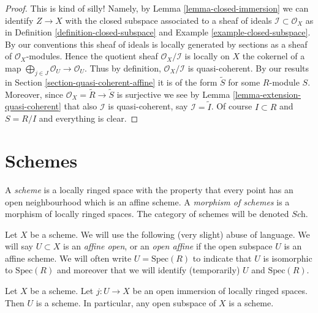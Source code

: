 \begin{proof}
This is kind of silly! Namely, by Lemma \ref{lemma-closed-immersion}
we can identify $Z \to X$ with the closed subspace associated to
a sheaf of ideals $\mathcal{I} \subset \mathcal{O}_X$ as in
Definition \ref{definition-closed-subspace} and
Example \ref{example-closed-subspace}.
By our conventions this sheaf of ideals is locally generated
by sections as a sheaf of $\mathcal{O}_X$-modules.
Hence the quotient sheaf $\mathcal{O}_X / \mathcal{I}$
is locally on $X$ the cokernel
of a map $\bigoplus_{j \in J} \mathcal{O}_U \to \mathcal{O}_U$.
Thus by definition, $\mathcal{O}_X / \mathcal{I}$ is quasi-coherent.
By our results in Section \ref{section-quasi-coherent-affine}
it is of the form $\widetilde S$ for some $R$-module $S$.
Moreover, since $\mathcal{O}_X = \widetilde R \to \widetilde S$
is surjective we see by Lemma \ref{lemma-extension-quasi-coherent}
that also $\mathcal{I}$ is quasi-coherent, say $\mathcal{I} = \widetilde I$.
Of course $I \subset R$ and $S = R/I$ and everything is clear.
\end{proof}













\section{Schemes}
\label{section-schemes}

\begin{definition}
\label{definition-scheme}
A {\it scheme} is a locally ringed space with the property that
every point has an open neighbourhood which is an affine scheme.
A {\it morphism of schemes} is a morphism of locally
ringed spaces. The category of schemes will be denoted
$\textit{Sch}$.
\end{definition}

\noindent
Let $X$ be a scheme.
We will use the following (very slight) abuse of language.
We will say $U \subset X$ is an {\it affine open}, or an {\it open affine}
if the open subspace $U$ is an affine scheme. We will often
write $U = \text{Spec}(R)$ to indicate that $U$ is isomorphic
to $\text{Spec}(R)$ and moreover that we will identify (temporarily)
$U$ and $\text{Spec}(R)$.

\begin{lemma}
\label{lemma-open-subspace-scheme}
Let $X$ be a scheme. Let $j : U \to X$ be an open immersion
of locally ringed spaces. Then $U$ is a scheme. In particular,
any open subspace of $X$ is a scheme.
\end{lemma}

